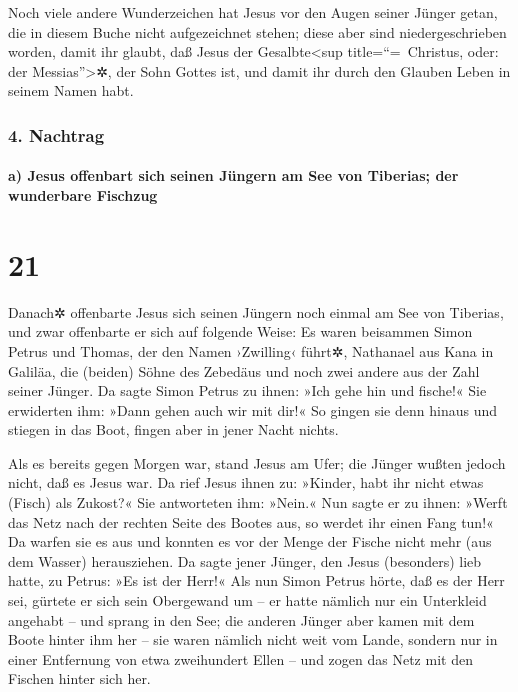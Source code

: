  Noch viele andere Wunderzeichen hat Jesus vor den Augen
seiner Jünger getan, die in diesem Buche nicht aufgezeichnet stehen;
 diese aber sind niedergeschrieben worden, damit ihr
glaubt, daß Jesus der Gesalbte\textless sup title=``=~Christus, oder:
der Messias''\textgreater✲, der Sohn Gottes ist, und damit ihr durch den
Glauben Leben in seinem Namen habt.

\hypertarget{nachtrag}{%
\subsubsection{4. Nachtrag}\label{nachtrag}}

\hypertarget{a-jesus-offenbart-sich-seinen-juxfcngern-am-see-von-tiberias-der-wunderbare-fischzug}{%
\paragraph{a) Jesus offenbart sich seinen Jüngern am See von Tiberias;
der wunderbare
Fischzug}\label{a-jesus-offenbart-sich-seinen-juxfcngern-am-see-von-tiberias-der-wunderbare-fischzug}}

\hypertarget{section-20}{%
\section{21}\label{section-20}}

 Danach✲ offenbarte Jesus sich seinen Jüngern noch einmal
am See von Tiberias, und zwar offenbarte er sich auf folgende Weise:
 Es waren beisammen Simon Petrus und Thomas, der den Namen
›Zwilling‹ führt✲, Nathanael aus Kana in Galiläa, die (beiden) Söhne des
Zebedäus und noch zwei andere aus der Zahl seiner Jünger. 
Da sagte Simon Petrus zu ihnen: »Ich gehe hin und fische!« Sie
erwiderten ihm: »Dann gehen auch wir mit dir!« So gingen sie denn hinaus
und stiegen in das Boot, fingen aber in jener Nacht nichts.

 Als es bereits gegen Morgen war, stand Jesus am Ufer; die
Jünger wußten jedoch nicht, daß es Jesus war.  Da rief
Jesus ihnen zu: »Kinder, habt ihr nicht etwas (Fisch) als Zukost?« Sie
antworteten ihm: »Nein.«  Nun sagte er zu ihnen: »Werft
das Netz nach der rechten Seite des Bootes aus, so werdet ihr einen Fang
tun!« Da warfen sie es aus und konnten es vor der Menge der Fische nicht
mehr (aus dem Wasser) herausziehen.  Da sagte jener
Jünger, den Jesus (besonders) lieb hatte, zu Petrus: »Es ist der Herr!«
Als nun Simon Petrus hörte, daß es der Herr sei, gürtete er sich sein
Obergewand um -- er hatte nämlich nur ein Unterkleid angehabt -- und
sprang in den See;  die anderen Jünger aber kamen mit dem
Boote hinter ihm her -- sie waren nämlich nicht weit vom Lande, sondern
nur in einer Entfernung von etwa zweihundert Ellen -- und zogen das Netz
mit den Fischen hinter sich her.

